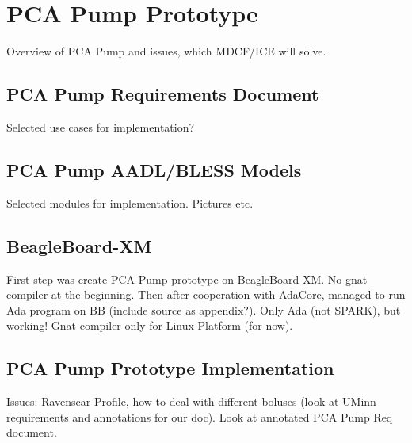 
\cleardoublepage


\chapter{PCA Pump Prototype}
\label{pcapump}

Overview of PCA Pump and issues, which MDCF/ICE will solve.


\section{PCA Pump Requirements Document}
\label{pcapump:requirements-doc}
Selected use cases for implementation?


\section{PCA Pump AADL/BLESS Models}
\label{pcapump:aadl-bless-models}
Selected modules for implementation. Pictures etc.


\section{BeagleBoard-XM}
\label{pcapump:beagleboard}
First step was create PCA Pump prototype on BeagleBoard-XM.
No gnat compiler at the beginning. Then after cooperation with AdaCore, managed to run Ada program on BB (include source as appendix?). Only Ada (not SPARK), but working!
Gnat compiler only for Linux Platform (for now).


\section{PCA Pump Prototype Implementation}
\label{pcapump:implementation}
Issues: Ravenscar Profile, how to deal with different boluses (look at UMinn requirements and annotations for our doc).
Look at annotated PCA Pump Req document.